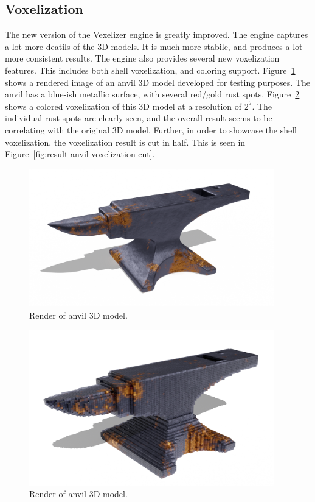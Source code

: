 \subsection{Voxelization}
The new version of the Vexelizer engine is greatly improved. The engine captures a lot more deatils of the 3D models. It is much more stabile, and produces a lot more consistent results. The engine also provides several new voxelization features. This includes both shell voxelization, and coloring support. Figure~\ref{fig:anvil-render} shows a rendered image of an anvil 3D model developed for testing purposes. The anvil has a blue-ish metallic surface, with several red/gold rust spots. Figure~\ref{fig:result-anvil-voxelization} shows a colored voxelization of this 3D model at a resolution of $2^7$. The individual rust spots are clearly seen, and the overall result seems to be correlating with the original 3D model. Further, in order to showcase the shell voxelization, the voxelization result is cut in half. This is seen in Figure~\ref{fig:result-anvil-voxelization-cut}.
\begin{figure}[htp]
    \centering
    \includegraphics[width=0.95\textwidth]{sections/result/figures/anvil-color-render.png}
    \caption{Render of anvil 3D model.}
    \label{fig:anvil-render}
\end{figure}
\begin{figure}[htp]
    \centering
    \includegraphics[width=0.95\textwidth]{sections/result/figures/anvil-voxelized-v1-color-128.png}
    \caption{Render of anvil 3D model.}
    \label{fig:result-anvil-voxelization}
\end{figure}
